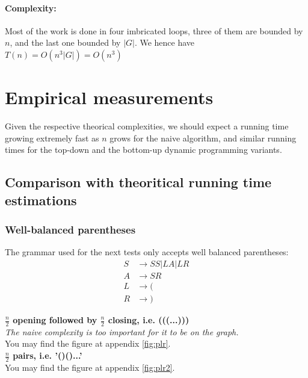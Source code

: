 \documentclass[twocolumn]{article}
\begin{document}
\paragraph{Complexity:}
Most of the work is done in four imbricated loops, three of them are bounded by $n$, and the last one
bounded by $|G|$.
We hence have $T(n)=O(n^3|G|)=O(n^3)$

\section{Empirical measurements}
Given the respective theorical complexities, we should expect a running time growing extremely fast as $n$ grows for the naive algorithm, and similar running times for the top-down and the bottom-up dynamic programming variants.
\subsection{Comparison with theoritical running time estimations}
\subsubsection{Well-balanced parentheses}
The grammar used for the next tests only accepts well balanced parentheses:
\begin{align*}
  S&\rightarrow SS | LA | LR\\
  A&\rightarrow SR\\
  L&\rightarrow (\\
  R&\rightarrow )
\end{align*}

\textbf{$\frac n2$ opening followed by $\frac n2$ closing, i.e. (((...)))}\\
\textit{The naive complexity is too important for it to be on the graph.}\\
You may find the figure at appendix \ref{fig:plr}.
\\

\textbf{$\frac n2$ pairs, i.e. '()()...'}\\
You may find the figure at appendix \ref{fig:plr2}.
\\
\end{document}
